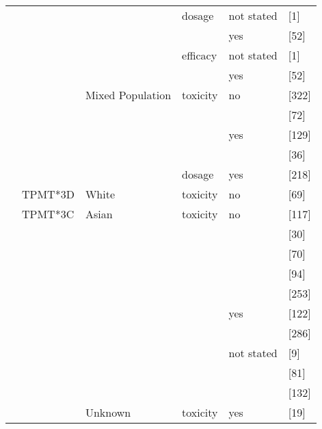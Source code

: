 \begin{center}
\begin{longtable}[H]{|l|l|l|l||l||l|}
\cline{4-6}
& & & dosage & not stated & \citeauthor{pmid12477776} \citeyear{pmid12477776} [1] \\
\cline{5-6}
& & & & yes & \citeauthor{Gardiner_2008} \citeyear{Gardiner_2008} [52] \\
\cline{4-6}
& & & efficacy & not stated & \citeauthor{pmid12477776} \citeyear{pmid12477776} [1] \\
\cline{5-6}
& & & & yes & \citeauthor{Gardiner_2008} \citeyear{Gardiner_2008} [52] \\
\cline{3-6}
& & Mixed Population & toxicity & no & \citeauthor{Newman_2011} \citeyear{Newman_2011} [322] \\
\cline{6-6}
& & & & & \citeauthor{RIDDER_2006} \citeyear{RIDDER_2006} [72] \\
\cline{5-6}
& & & & yes & \citeauthor{Heckmann_2005} \citeyear{Heckmann_2005} [129] \\
\cline{6-6}
& & & & & \citeauthor{Formea_2004} \citeyear{Formea_2004} [36] \\
\cline{4-6}
& & & dosage & yes & \citeauthor{Fabre_2004} \citeyear{Fabre_2004} [218] \\
\cline{2-6}
& TPMT*3D & White & toxicity & no & \citeauthor{pmid12172211} \citeyear{pmid12172211} [69] \\
\cline{2-6}
& TPMT*3C & Asian & toxicity & no & \citeauthor{Takatsu_2009} \citeyear{Takatsu_2009} [117] \\
\cline{6-6}
& & & & & \citeauthor{Xin_2008} \citeyear{Xin_2008} [30] \\
\cline{6-6}
& & & & & \citeauthor{pmid18827410} \citeyear{pmid18827410} [70] \\
\cline{6-6}
& & & & & \citeauthor{pmid16396707} \citeyear{pmid16396707} [94] \\
\cline{6-6}
& & & & & \citeauthor{Zhu_2016} \citeyear{Zhu_2016} [253] \\
\cline{5-6}
& & & & yes & \citeauthor{Song_2006} \citeyear{Song_2006} [122] \\
\cline{6-6}
& & & & & \citeauthor{Kim_2010} \citeyear{Kim_2010} [286] \\
\cline{5-6}
& & & & not stated & \citeauthor{Tamori_2007} \citeyear{Tamori_2007} [9] \\
\cline{6-6}
& & & & & \citeauthor{Lee_2016} \citeyear{Lee_2016} [81] \\
\cline{6-6}
& & & & & \citeauthor{Fangbin_2016} \citeyear{Fangbin_2016} [132] \\
\cline{3-6}
& & Unknown & toxicity & yes & \citeauthor{Hawwa_2008} \citeyear{Hawwa_2008} [19] \\

\end{longtable}
\end{center}
